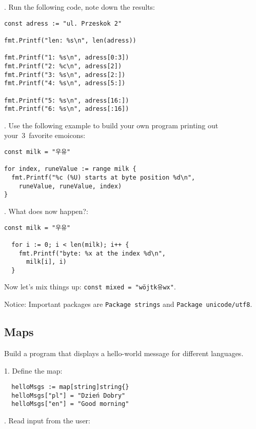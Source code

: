 \documentclass[11pt, letterpaper]{article}
\begin{document}
. Run the following code, note down the results:

\begin{verbatim}
const adress := "ul. Przeskok 2"

fmt.Printf("len: %s\n", len(adress))

fmt.Printf("1: %s\n", adress[0:3])
fmt.Printf("2: %c\n", adress[2])
fmt.Printf("3: %s\n", adress[2:])
fmt.Printf("4: %s\n", adress[5:])

fmt.Printf("5: %s\n", adress[16:])
fmt.Printf("6: %s\n", adress[:16])
\end{verbatim}


. Use the following example to build your own program printing out your~3~favorite emoicons:

\begin{verbatim}
const milk = "우유"

for index, runeValue := range milk {
  fmt.Printf("%c (%U) starts at byte position %d\n",
    runeValue, runeValue, index)
}
\end{verbatim}

. What does now happen?:

\begin{verbatim}
const milk = "우유"

  for i := 0; i < len(milk); i++ {
    fmt.Printf("byte: %x at the index %d\n",
      milk[i], i)
  }
\end{verbatim}

Now let's mix things up: \texttt{const mixed = "wöjtk유wx"}.

\bigskip
Notice: Important packages are \verb|Package strings| and \verb|Package unicode/utf8|.

\subsection{Maps}

Build a program that displays a hello-world message for different languages.

1. Define the map:

\begin{verbatim}
  helloMsgs := map[string]string{}
  helloMsgs["pl"] = "Dzień Dobry"
  helloMsgs["en"] = "Good morning" 
\end{verbatim}

. Read input from the user:
\end{document}
